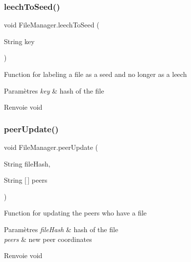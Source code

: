 \subsubsection{\texorpdfstring{leech\+To\+Seed()}{leechToSeed()}}
{\footnotesize\ttfamily void File\+Manager.\+leech\+To\+Seed (\begin{DoxyParamCaption}\item[{String}]{key }\end{DoxyParamCaption})\hspace{0.3cm}{\ttfamily [inline]}}

Function for labeling a file as a seed and no longer as a leech


\begin{DoxyParams}{Paramètres}
{\em key} & hash of the file \\
\hline
\end{DoxyParams}
\begin{DoxyReturn}{Renvoie}
void 
\end{DoxyReturn}
\mbox{\label{classFileManager_a39b7d3eb829e3ecc259c4da41aa38656}} 
\subsubsection{\texorpdfstring{peer\+Update()}{peerUpdate()}}
{\footnotesize\ttfamily void File\+Manager.\+peer\+Update (\begin{DoxyParamCaption}\item[{String}]{file\+Hash,  }\item[{String \mbox{[}$\,$\mbox{]}}]{peers }\end{DoxyParamCaption})\hspace{0.3cm}{\ttfamily [inline]}}

Function for updating the peers who have a file


\begin{DoxyParams}{Paramètres}
{\em file\+Hash} & hash of the file \\
\hline
{\em peers} & new peer coordinates \\
\hline
\end{DoxyParams}
\begin{DoxyReturn}{Renvoie}
void 
\end{DoxyReturn}
\mbox{\label{classFileManager_a902e9eeb706da69a9611d04172b945fd}} 
